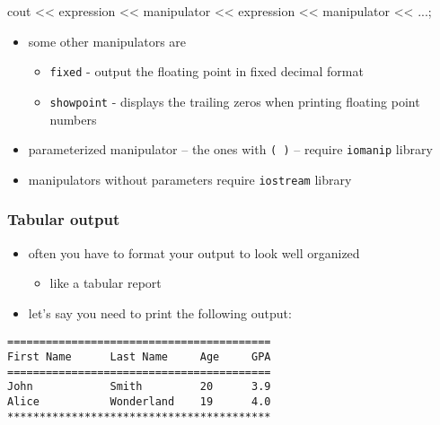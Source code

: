 \documentclass[11pt]{article}
\providecommand{\tightlist}{%
      \setlength{\itemsep}{0pt}\setlength{\parskip}{0pt}}
\newenvironment{Shaded}{}{}
\newcommand{\NormalTok}[1]{{#1}}
\newcommand{\OperatorTok}[1]{\textcolor[rgb]{0.40,0.40,0.40}{{#1}}}
\begin{document}
\begin{Shaded}
\begin{Highlighting}[]
\NormalTok{cout }\OperatorTok{\textless{}\textless{}}\NormalTok{ expression }\OperatorTok{\textless{}\textless{}}\NormalTok{ manipulator }\OperatorTok{\textless{}\textless{}}\NormalTok{ expression }\OperatorTok{\textless{}\textless{}}\NormalTok{ manipulator }\OperatorTok{\textless{}\textless{}} \OperatorTok{...;}
\end{Highlighting}
\end{Shaded}

\begin{itemize}
\tightlist
\item
  some other manipulators are

  \begin{itemize}
  \tightlist
  \item
    \texttt{fixed} - output the floating point in fixed decimal format
  \item
    \texttt{showpoint} - displays the trailing zeros when printing
    floating point numbers
  \end{itemize}
\item
  parameterized manipulator -- the ones with \texttt{(\ )} -- require
  \texttt{iomanip} library
\item
  manipulators without parameters require \texttt{iostream} library
\end{itemize}

\hypertarget{tabular-output}{%
\subsubsection{Tabular output}\label{tabular-output}}

\begin{itemize}
\tightlist
\item
  often you have to format your output to look well organized

  \begin{itemize}
  \tightlist
  \item
    like a tabular report
  \end{itemize}
\item
  let's say you need to print the following output:
\end{itemize}

\begin{verbatim}
=========================================
First Name      Last Name     Age     GPA
=========================================
John            Smith         20      3.9
Alice           Wonderland    19      4.0
*****************************************
\end{verbatim}
\end{document}
